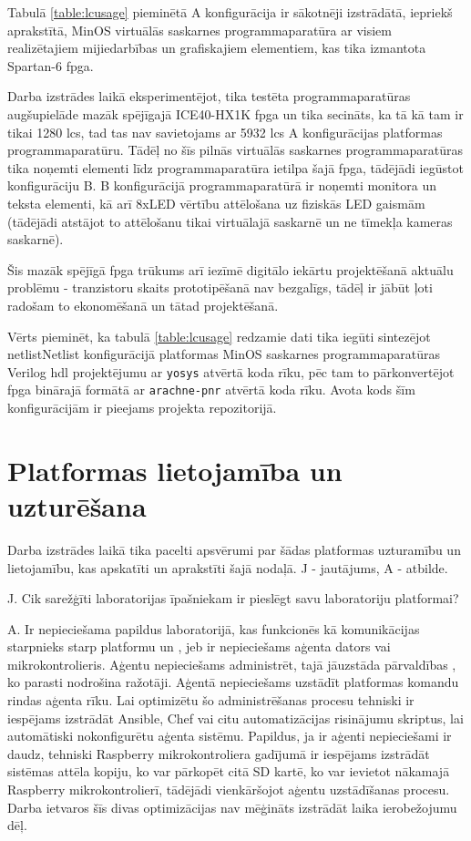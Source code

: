 Tabulā \ref{table:lcusage} pieminētā A konfigurācija ir sākotnēji izstrādātā,
iepriekš aprakstītā, MinOS virtuālās saskarnes programmaparatūra ar visiem
realizētajiem mijiedarbības un grafiskajiem elementiem, kas tika izmantota
Spartan-6 \gls{fpga}.

Darba izstrādes laikā eksperimentējot, tika testēta programmaparatūras
augšupielāde mazāk spējīgajā ICE40-HX1K \gls{fpga} un tika secināts, ka tā kā
tam ir tikai 1280 \gls{lcs}, tad tas nav savietojams ar 5932 \gls{lcs} A
konfigurācijas platformas programmaparatūru. Tādēļ no šīs pilnās virtuālās
saskarnes programmaparatūras tika noņemti elementi līdz programmaparatūra
ietilpa šajā \gls{fpga}, tādējādi iegūstot konfigurāciju B. B konfigurācijā
programmaparatūrā ir noņemti monitora un teksta elementi, kā arī 8xLED vērtību
attēlošana uz fiziskās  LED gaismām (tādējādi
atstājot to attēlošanu tikai virtuālajā saskarnē un ne tīmekļa kameras
saskarnē).  

Šis mazāk spējīgā \gls{fpga} trūkums arī iezīmē digitālo iekārtu projektēšanā
aktuālu problēmu - tranzistoru skaits prototipēšanā nav bezgalīgs, tādēļ ir
jābūt ļoti radošam to ekonomēšanā un tātad projektēšanā. 

Vērts pieminēt, ka tabulā \ref{table:lcusage} redzamie dati tika iegūti
sintezējot \gls{netlist}{Netlist konfigurācijā} platformas MinOS saskarnes
programmaparatūras Verilog \gls{hdl} projektējumu ar \lstinline!yosys! atvērtā
koda rīku, pēc tam to pārkonvertējot \gls{fpga} binārajā formātā ar
\lstinline!arachne-pnr! atvērtā koda rīku. Avota kods šīm konfigurācijām ir
pieejams projekta repozitorijā. \cite{VeinbahsKrisjanisTestbed}

\section{Platformas lietojamība un uzturēšana}
\label{sec:maintenance}

Darba izstrādes laikā tika pacelti apsvērumi par šādas platformas uzturamību un
lietojamību, kas apskatīti un aprakstīti šajā nodaļā. J - jautājums, A -
atbilde.

J. Cik sarežģīti laboratorijas īpašniekam ir pieslēgt savu laboratoriju
platformai?

A. Ir nepieciešama papildus  laboratorijā, kas
funkcionēs kā komunikācijas starpnieks starp platformu un
, jeb ir nepieciešams aģenta dators vai
mikrokontrolieris. Aģentu nepieciešams administrēt, tajā jāuzstāda
 pārvaldības , ko parasti nodrošina
 ražotāji. Aģentā nepieciešams uzstādīt platformas
komandu rindas aģenta rīku. Lai optimizētu šo administrēšanas procesu tehniski
ir iespējams izstrādāt Ansible, Chef vai citu automatizācijas risinājumu
skriptus, lai automātiski nokonfigurētu aģenta sistēmu. Papildus, ja ir aģenti
nepieciešami ir daudz, tehniski Raspberry mikrokontroliera gadījumā ir iespējams
izstrādāt sistēmas attēla kopiju, ko var pārkopēt citā SD kartē, ko var ievietot
nākamajā Raspberry mikrokontrolierī, tādējādi vienkāršojot aģentu uzstādīšanas
procesu. Darba ietvaros šīs divas optimizācijas nav mēģināts izstrādāt laika
ierobežojumu dēļ.

